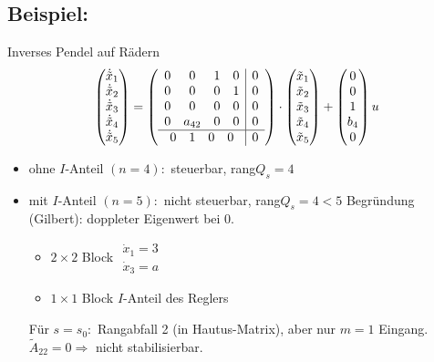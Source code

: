 \documentclass[ngerman]{tudscrreprt}
\begin{document}
\subsection*{Beispiel:}
Inverses Pendel auf Rädern\begin{align*}
\begin{pmatrix} \dot{\tilde x}_1\\ \dot{\tilde x}_2\\\dot{\tilde x}_3\\\dot{\tilde x}_4\\\dot{\tilde x}_5\end{pmatrix} = \left(\begin{array}{ c | c }
\begin{matrix} 0 & 0 & 1 & 0\\ 0 & 0 & 0 & 1\\ 0  &0 & 0& 0\\ 0 & a_{42} & 0 &0\end{matrix} & \begin{matrix} 0\\ 0\\ 0\\ 0\end{matrix} \\ \hline \begin{matrix} 0 & 1 & 0 & 0 \end{matrix} & 0
\end{array}\right) \cdot \begin{pmatrix} \tilde x_1\\ \tilde x_2\\\tilde x_3\\\tilde x_4\\\tilde x_5\end{pmatrix} + \begin{pmatrix} 0 \\ 0\\ 1 \\ b_4 \\ 0  \end{pmatrix} u \end{align*} 
\begin{itemize}
\item ohne $I$-Anteil $(n=4):$ steuerbar, rang$Q_s = 4$
\item mit $I$-Anteil $(n=5):$ nicht steuerbar, rang$Q_s = 4 < 5$
Begründung (Gilbert): doppleter Eigenwert bei 0. \begin{itemize} \item $2\times 2$ Block $\substack{\dot x_1 = 3\\ \dot x_3 = a}$
\item $1\times 1$ Block $I$-Anteil des Reglers \end{itemize} 
Für $s =s_0:$ Rangabfall 2 (in Hautus-Matrix), aber nur $m=1 $ Eingang. \\ 
$\tilde A_{22} = 0\Rightarrow$ nicht stabilisierbar.
\end{itemize}
\end{document}
